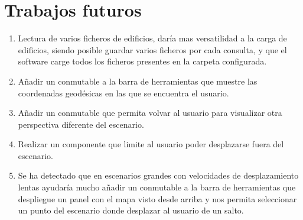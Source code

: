 \documentclass[a4paper, 11pt]{book}
\begin{document}
\section{Trabajos futuros}
\begin{enumerate}
    \item Lectura de varios ficheros de edificios, daría mas versatilidad a la carga de edificios, siendo posible guardar varios ficheros por cada consulta, y que el software carge todos los ficheros presentes en la carpeta configurada.
    \item Añadir un conmutable a la barra de herramientas que muestre las coordenadas geodésicas en las que se encuentra el usuario.
    \item Añadir un conmutable que permita volvar al usuario para visualizar otra perspectiva diferente del escenario.
    \item Realizar un componente que limite al usuario poder desplazarse fuera del escenario.
    \item Se ha detectado que en escenarios grandes con velocidades de desplazamiento lentas ayudaría mucho añadir un conmutable a la barra de herramientas que despliegue un panel con el mapa visto desde arriba y nos permita seleccionar un punto del escenario donde desplazar al usuario de un salto.
\end{enumerate}
\label{sec:trabajos_futuros}
\nocite{*}


\end{document}

